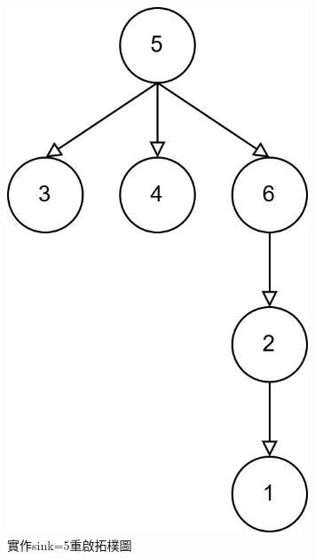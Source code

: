 \begin{ZhChapter}
\begin{figure}[H]
    \centering
    \includegraphics[width = 0.8\textwidth]{image/實作sink=5重啟拓樸圖.jpg}
    \caption{實作sink=5重啟拓樸圖}
    \label{fig: 實作sink=5重啟拓樸圖}
\end{figure}

\section{}

\end{ZhChapter}